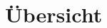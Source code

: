 \documentclass[a4paper,10pt]{scrartcl}
\begin{document}
\tableofcontents
\section{Übersicht}
\end{document}
